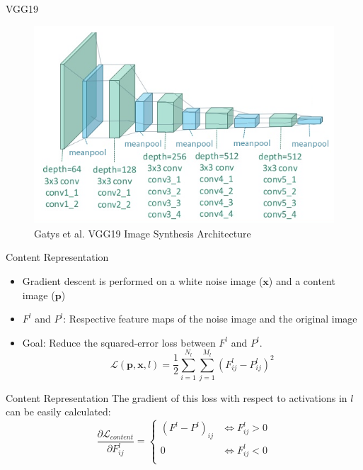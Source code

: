 \documentclass{beamer}
\begin{document}
\begin{frame}{VGG19}
\begin{figure}[H]
\centering
\includegraphics[width=.9\textwidth]{img/vgg19/synthesis}
\caption{Gatys et al. VGG19 Image Synthesis Architecture}
\end{figure}
\end{frame}

\begin{frame}{Content Representation}
    \begin{itemize}
        \item Gradient descent is performed on a white noise image
            ($\mathbf{x}$) and a content image
            ($\mathbf{p}$)
        \item $F^l$ and $P^l$: Respective feature maps of the
            noise image and the original image
        \item Goal: Reduce the squared-error loss between $F^l$ and $P^l$.
    \begin{equation}
        \mathcal{L}(\mathbf{p}, \mathbf{x}, l) =
        \frac{1}{2} \sum_{i=1}^{N_l}\sum_{j=1}^{M_l}{(F^l_{ij} - P^l_{ij})^2}
    \end{equation}
    \end{itemize}
\end{frame}

\begin{frame}{Content Representation}
    The gradient of this loss with respect to activations in $l$ can be easily
    calculated:
    \begin{equation}
        \frac{\partial \mathcal{L}_{content}}{\partial F^l_{ij}}
        =
        \begin{cases}
            (F^l - P^l)_{ij} & \iff F^l_{ij} > 0 \\
            0 & \iff F^l_{ij} < 0 \\
        \end{cases}
    \end{equation}
\end{frame}
\end{document}
